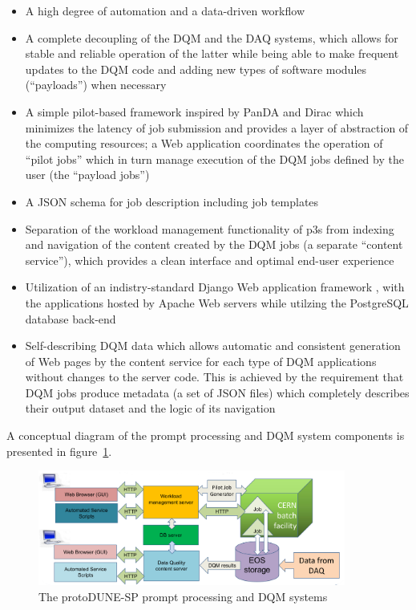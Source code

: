 \documentclass{webofc}
\begin{document}
\begin{itemize}

\item A high degree of automation and a data-driven workflow

\item A complete decoupling of the DQM and the DAQ systems, which allows
for stable and reliable operation of the latter while being able to make frequent updates to the
DQM code and adding new types of software modules (``payloads'') when necessary

\item A simple pilot-based framework inspired by PanDA and Dirac \cite{panda,dirac}
which minimizes the latency of job submission and provides a layer of abstraction
of the computing resources; a Web application coordinates the operation of ``pilot jobs''
which in turn manage execution of the DQM jobs defined by the user (the ``payload jobs'')

\item A JSON schema for job description including job templates

\item Separation of the workload management functionality  of p3s  from
indexing and navigation of the content created by the DQM  jobs (a separate ``content service''),
which provides a clean interface and optimal end-user experience

\item Utilization of an indistry-standard Django Web application framework  \cite{django},
with the applications hosted by Apache Web servers while utilzing the PostgreSQL database
back-end

\item Self-describing DQM data which allows automatic and consistent generation of Web pages
by the content service for each type of DQM applications without changes to the server code.
This is achieved by the requirement that DQM jobs produce metadata (a set of JSON files)
which completely describes their output dataset and the logic of its navigation

\end{itemize}
\noindent
A conceptual diagram of the prompt processing and DQM system components
is presented in figure~\ref{fig:dqm-diagram}.

\begin{figure}[h]
\centering
\includegraphics[width=0.9\textwidth,clip]{figures/dqm-p3s-diagram.png}
\caption{The protoDUNE-SP prompt processing and DQM systems}
\label{fig:dqm-diagram}
\end{figure}
\end{document}
